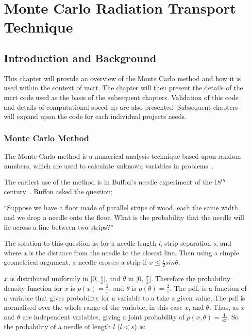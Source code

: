 \chapter{Monte Carlo Radiation Transport Technique}
\label{sec:mcrt}
\section{Introduction and Background}
This chapter will provide an overview of the Monte Carlo method and how it is used within the context of \gls{mcrt}. The chapter will then present the details of the \gls{mcrt} code used as the basis of the subsequent chapters. Validation of this code and details of computational speed up are also presented. Subsequent chapters will expand upon the code for each individual projects needs.

\subsection*{Monte Carlo Method}\label{sec:mcmethod}
The Monte Carlo method is a numerical analysis technique based upon random numbers, which are used to calculate unknown variables in problems~\cite{cashwell1959practical,rogers1990monte}. 

The earliest use of the method is in Buffon's needle experiment of the 18$^{th}$ century~\cite{badger1994lazzarini,beckmann2015history,buffon1785histoire}. Buffon asked the question;

\medskip

``Suppose we have a floor made of parallel strips of wood, each the same width, and we drop a needle onto the floor. What is the probability that the needle will lie across a line between two strips?''

\medskip

The solution to this question is:
for a needle length \textit{l}, strip separation \textit{s}, and where \textit{x} is the distance from the needle to the closest line. Then using a simple geometrical argument, a needle crosses a strip if $x \leq \tfrac{l}{2} sin \theta$.

$x$ is distributed uniformly in [0, $\tfrac{s}{2}$], and $\theta$ in [0, $\tfrac{\pi}{2}$]. Therefore the probability density function for $x$ is $p(x)=\tfrac{2}{s}$, and $\theta$ is $p(\theta) = \tfrac{2}{\pi}$. The \gls{pdf}, is a function of a variable that gives probability for a variable to a take a given value. The \gls{pdf} is normalised over the whole range of the variable, in this case $x$, and $\theta$.
Thus, as $x$ and $\theta$ are independent variables, giving a joint probability of $p(x,\theta) = \tfrac{4}{s \pi}$.
So the probability of a needle of length $l$ ($l<s$) is:

